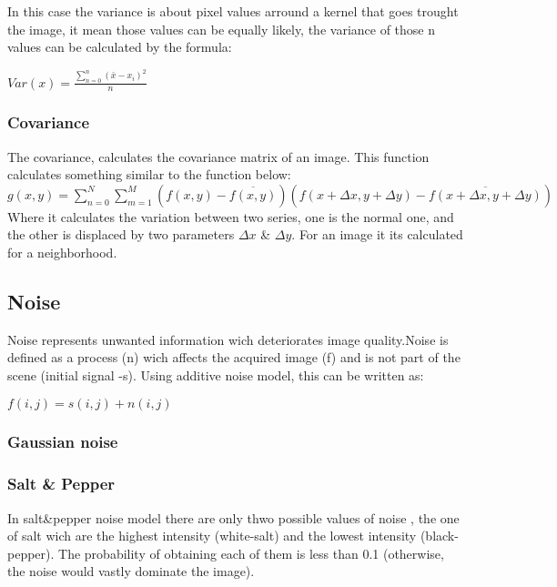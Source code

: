 \documentclass[a4paper]{article}
\begin{document}
In this case the variance is about pixel values arround a kernel that goes trought the image, it mean those values can be equally likely, the variance of those n values can be calculated by the formula: 

\begin{math}
Var(x)= \frac{\sum_{n=0}^{n}\!\!(\bar x - x_i)^2}{n}
\end{math}

\subsubsection{Covariance}

The covariance, calculates the covariance matrix of an image. This function calculates something similar to the function below: \\
\begin{math} 
	g(x,y) = \sum \limits_{n=0}^{N} \sum \limits_{m=1}^M \left( f(x,y) - \overline{f(x,y)}\right)\left(f(x + \Delta x, y + \Delta y) - \overline{f(x + \Delta x, y + \Delta y)} \right)
\end{math}
Where it calculates the variation between two series, one is the normal one, and the other is displaced by two parameters $\Delta x$ \& $\Delta y$. For an image it its calculated for a neighborhood.


\subsection{Noise}

Noise represents unwanted information wich deteriorates image quality.Noise is defined as a process (n) wich affects the acquired image (f) and is not part of the scene (initial signal -s). Using additive noise model, this can be written as:

\begin{math}
f(i,j)=s(i,j) +n(i,j)
\end{math}


\subsubsection{Gaussian noise}


\subsubsection{Salt \& Pepper}

In salt\&pepper noise model there are only thwo possible values of noise , the one of salt wich are the highest intensity (white-salt) and the lowest intensity (black-pepper). The probability of obtaining each of them is less than 0.1 (otherwise, the noise would vastly dominate the image). 
\end{document}
